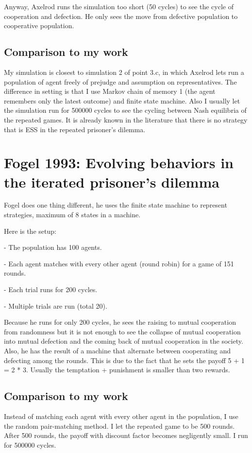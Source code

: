 \documentclass[12.5pt]{report}
\begin{document}
Anyway, Axelrod runs the simulation too short (50 cycles) to see the cycle of cooperation and defection. He only sees the move from defective population to cooperative population.

\subsection{Comparison to my work}
My simulation is closest to simulation 2 of point 3.c, in which Axelrod lets run a population of agent freely of prejudge and assumption on representatives. The difference in setting is that I use Markov chain of memory 1 (the agent remembers only the latest outcome) and finite state machine. Also I usually let the simulation run for 500000 cycles to see the cycling between Nash equilibria of the repeated games. It is already known in the literature that there is no strategy that is ESS in the repeated prisoner’s dilemma.

\section{Fogel 1993: Evolving behaviors in the iterated prisoner’s dilemma}

Fogel does one thing different, he uses the finite state machine to represent strategies, maximum of 8 states in a machine. 

Here is the setup:

- The population has 100 agents.

- Each agent matches with every other agent (round robin) for a game of 151 rounds.

- Each trial runs for 200 cycles.

- Multiple trials are run (total 20).

Because he runs for only 200 cycles, he sees the raising to mutual cooperation from randomness but it is not enough to see the collapse of mutual cooperation into mutual defection and the coming back of mutual cooperation in the society.\\

Also, he has the result of a machine that alternate between cooperating and defecting among the rounds. This is due to the fact that he sets the payoff 5 + 1 = 2 * 3. Usually the temptation + punishment is smaller than two rewards.\\

\subsection{Comparison to my work}
Instead of matching each agent with every other agent in the population, I use the random pair-matching method. I let the repeated game to be 500 rounds. After 500 rounds, the payoff with discount factor becomes negligently small. I run for 500000 cycles.
\end{document}
